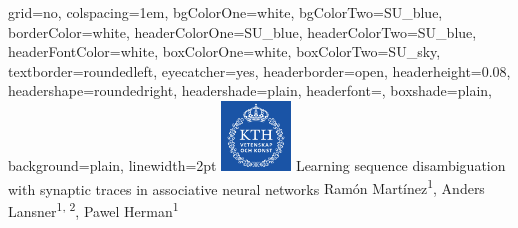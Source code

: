 \documentclass[portrait ,a4, final]{baposter}
\begin{document}

\newlength{\leftimgwidth}
\begin{poster}%
  {
  grid=no,
  colspacing=1em,
  bgColorOne=white,
  bgColorTwo=SU_blue,
  borderColor=white,
  headerColorOne=SU_blue,
  headerColorTwo=SU_blue,
  headerFontColor=white,
  boxColorOne=white, %
  boxColorTwo=SU_sky,
  textborder=roundedleft,
  eyecatcher=yes,
  headerborder=open,
  headerheight=0.08\textheight,
  headershape=roundedright,
  headershade=plain,
  headerfont=\Large\textsf, %
  boxshade=plain,
  background=plain,
  linewidth=2pt
  }
  {\includegraphics[height=5em]{Kth_logo2.png}} %
  {\sf %
  \color{black} Learning sequence disambiguation with synaptic traces in associative neural networks}
  {\sf %
  \vspace{0.5em}
  \color{SU_fire} Ram{\'o}n Mart{\'i}nez\textsuperscript{1},  Anders Lansner\textsuperscript{1, 2}, Pawel Herman\textsuperscript{1}\\ 
  \color{black}
  }
  {%
  }


\end{poster}
\end{document}
